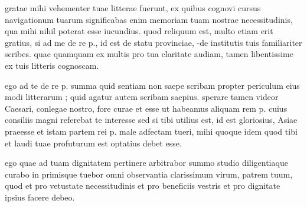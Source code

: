 


 gratae mihi vehementer tuae litterae fuerunt, ex quibus cognovi cursus navigationum tuarum significabas enim memoriam tuam nostrae necessitudinis, qua mihi nihil poterat esse iucundius. quod reliquum est, multo etiam erit gratius, si ad me de re p., id est de statu provinciae, -de institutis tuis familiariter scribes. quae quamquam ex multis pro tua claritate audiam, tamen libentissime ex tuis litteris cognoscam.

 ego ad te de re p. summa quid sentiam non saepe scribam propter periculum eius modi litterarum ; quid agatur autem scribam saepius. sperare tamen videor Caesari, conlegae nostro, fore curae et esse ut habeamus aliquam rem p. cuius consiliis magni referebat te interesse sed si tibi utilius est, id est gloriosius, Asiae praeesse et istam partem rei p. male adfectam tueri, mihi quoque idem quod tibi et laudi tuae profuturum est optatius debet esse.

 ego quae ad tuam dignitatem pertinere arbitrabor summo studio diligentiaque curabo in primisque tuebor omni observantia clarissimum virum, patrem tuum, quod et pro vetustate necessitudinis et pro beneficiis vestris et pro dignitate ipsius facere debeo.
